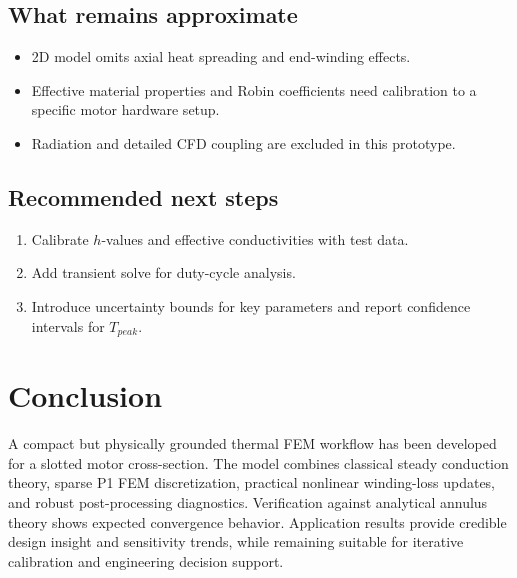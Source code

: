\documentclass[11pt,a4paper]{article}
\begin{document}
\subsection{What remains approximate}
\begin{itemize}
    \item 2D model omits axial heat spreading and end-winding effects.
    \item Effective material properties and Robin coefficients need calibration to a specific motor hardware setup.
    \item Radiation and detailed CFD coupling are excluded in this prototype.
\end{itemize}

\subsection{Recommended next steps}
\begin{enumerate}
    \item Calibrate \(h\)-values and effective conductivities with test data.
    \item Add transient solve for duty-cycle analysis.
    \item Introduce uncertainty bounds for key parameters and report confidence intervals for \(T_{peak}\).
\end{enumerate}

\section{Conclusion}
A compact but physically grounded thermal FEM workflow has been developed for a slotted motor cross-section. The model combines classical steady conduction theory, sparse P1 FEM discretization, practical nonlinear winding-loss updates, and robust post-processing diagnostics. Verification against analytical annulus theory shows expected convergence behavior. Application results provide credible design insight and sensitivity trends, while remaining suitable for iterative calibration and engineering decision support.
\end{document}
